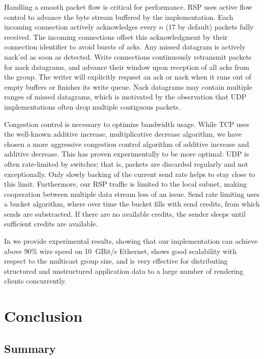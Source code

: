 Handling a smooth packet flow is critical for performance. RSP uses active flow
control to advance the byte stream buffered by the implementation. Each incoming
connection actively acknowledges every $n$ (17 by default) packets fully
received. The incoming connections offset this acknowledgment by their
connection identifier to avoid bursts of acks. Any missed datagram is actively
nack'ed as soon as detected. Write connections continuously retransmit packets
for nack datagrams, and advance their window upon reception of all acks from the
group. The writer will explicitly request an ack or nack when it runs out of
empty buffers or finishes its write queue. Nack datagrams may contain multiple
ranges of missed datagrams, which is motivated by the observation that UDP
implementations often drop multiple contiguous packets.

Congestion control is necessary to optimize bandwidth usage. While TCP uses the
well-known additive increase, multiplicative decrease algorithm, we have chosen
a more aggressive congestion control algorithm of additive increase and additive
decrease. This has proven experimentally to be more optimal: UDP is often
rate-limited by switches; that is, packets are discarded regularly and not
exceptionally. Only slowly backing of the current send rate helps to stay close
to this limit. Furthermore, our RSP traffic is limited to the local subnet,
making cooperation between multiple data stream less of an issue. Send rate
limiting uses a bucket algorithm, where over time the bucket fills with send
credits, from which sends are substracted. If there are no available credits,
the sender sleeps until sufficient credits are available.

In \cite{ESP:18} we provide experimental results, showing that our
implementation can achieve above 90\% wire speed on 10~GBit/s Ethernet, shows
good scalability with respect to the multicast group size, and is very effective
for distributing structured and unstructured application data to a large number
of rendering clients concurrently.

\chapter{Conclusion}\label{sConclusion}

\section{Summary}

